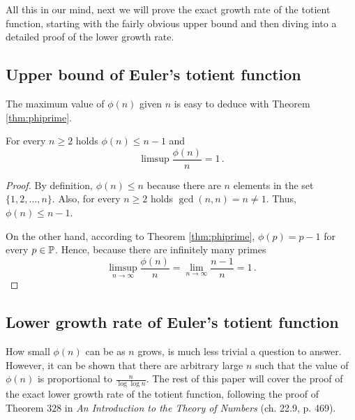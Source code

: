 \documentclass{article}
\begin{document}
All this in our mind, next we will prove the exact growth rate of the totient function, starting with the fairly obvious upper bound and then diving into a detailed proof of the lower growth rate.

\subsection{Upper bound of Euler's totient function}

The maximum value of $\phi(n)$ given $n$ is easy to deduce with Theorem \ref{thm:phiprime}.

\begin{theorem}%
For every $n \geq 2$ holds $\phi(n) \leq n-1$ and
\begin{equation*}
    \limsup{\frac{\phi(n)}{n}} = 1\,.
\end{equation*}

\begin{proof}

By definition, $\phi(n) \leq n$ because there are $n$ elements in the set $\{1,2,\dots,n\}$. Also, for every $n \geq 2$ holds $\gcd(n,n) = n \neq 1$. Thus, $\phi(n) \leq n-1$.

On the other hand, according to Theorem \ref{thm:phiprime}, $\phi(p) = p-1$ for every $p\in\mathbb{P}$.
Hence, because there are infinitely many primes %
\begin{equation*}
    \limsup_{n\rightarrow\infty}\frac{\phi(n)}{n} = \lim_{n\rightarrow\infty} \frac{n-1}{n} = 1\,.
\end{equation*}

\end{proof}

\end{theorem}

\subsection{Lower growth rate of Euler's totient function}

How small $\phi(n)$ can be as $n$ grows, is much less trivial a question to answer. However, it can be shown that there are arbitrary large $n$ such that the value of $\phi(n)$ is proportional to $\frac{n}{\log\log n}$. The rest of this paper will cover the proof of the exact lower growth rate of the totient function, following the proof of Theorem $328$
in \textit{An Introduction to the Theory of Numbers} \cite{HardyWright} (ch. 22.9, p. 469).
\end{document}
